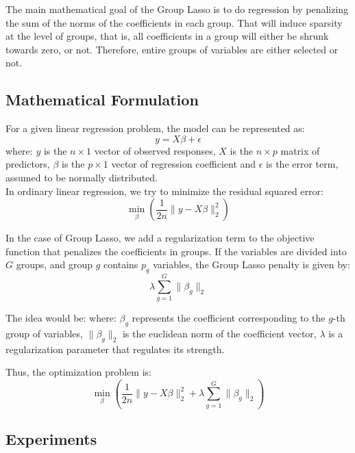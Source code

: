 \documentclass[a4paper, 9pt]{article}
\begin{document}
\begin{multicols}{2}
The main mathematical goal of the Group Lasso is to do regression by penalizing the sum of the norms of the coefficients in each group. That will induce sparsity at the level of groups, that is, all coefficients in a group will either be shrunk towards zero, or not. Therefore, entire groups of variables are either selected or not.

\subsection{Mathematical Formulation} \vspace{-3pt}
For a given linear regression problem, the model can be represented as:
\begin{equation}
y=X\beta + \epsilon
\end{equation}
where: $y$ is the $n \times 1$ vector of observed responses, $X$ is the $n \times p$ matrix of predictors, $\beta$ is the $p \times 1$ vector of regression coefficient and $\epsilon$ is the error term, assumed to be normally distributed.\\

In ordinary linear regression, we try to minimize the residual squared error: \begin{equation} \min_{\beta}\left (\frac{1}{2n}\lVert y-X\beta\rVert^{2}_{2} \right) 
\end{equation}

In the case of Group Lasso, we add a regularization term to the objective function that penalizes the coefficients in groups. If the variables are divided into $G$ groups, and group $g$ contains $p_{g}$ variables, the Group Lasso penalty is given by: \begin{equation} \lambda \sum_{g=1}^{G}\lVert \beta_{g} \rVert_{2}
\end{equation}

The idea would be: where: $\beta_g$ represents the coefficient corresponding to the $g$-th group of variables, $\lVert \beta_g \rVert_2$ is the euclidean norm of the coefficient vector, $\lambda$ is a regularization parameter that regulates its strength.

Thus, the optimization problem is: \begin{equation}
\min_{\beta}\left (\frac{1}{2n}\lVert y-X\beta\rVert^{2}_{2} + \lambda \sum_{g=1}^{G}\lVert \beta_{g} \rVert_{2}\right)
\end{equation}

\subsection{Experiments} \vspace{-3pt}


\end{multicols}
\end{document}
